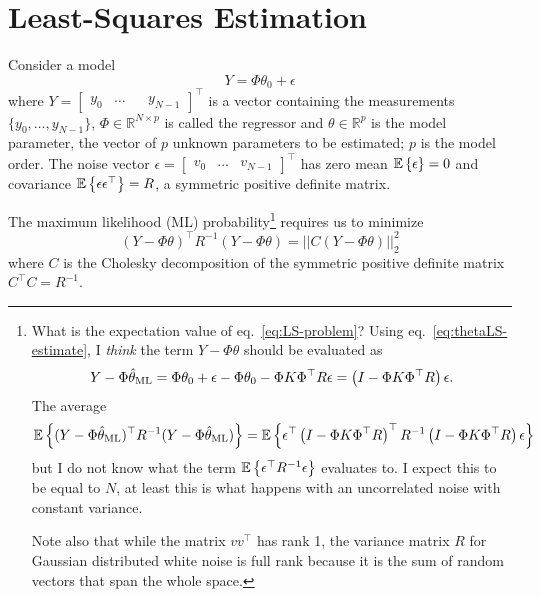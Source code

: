 \chapter{Least-Squares Estimation}
\label{chap:LS-estimation}

Consider a model
\begin{equation}
  \label{eq:LTI-with-noise}
  Y = \Phi\theta_0 + \epsilon
\end{equation}
where $Y = \begin{bmatrix}
  y_0 & \ldots && y_{N-1}
\end{bmatrix}^\top$ is a vector containing the measurements $\{y_0,\ldots, y_{N-1}\}$, $\Phi\in \mathbb{R}^{N\times p}$ is called the regressor and $\theta\in\mathbb{R}^p$ is the model parameter, the vector of $p$ unknown parameters to be estimated; $p$ is the model order.
The noise vector $\epsilon =
\begin{bmatrix}
  v_0 & \ldots & v_{N-1}
\end{bmatrix}^\top$ has zero mean $\mathbb{E}\left\{\epsilon\right\}=0$ and covariance $\mathbb{E}\left\{\epsilon \epsilon^\top\right\}=R$, a symmetric positive definite matrix.

The maximum likelihood (ML) probability\footnote{What is the expectation value of eq.~\eqref{eq:LS-problem}? Using eq.~\eqref{eq:thetaLS-estimate}, I \emph{think} the term $Y-\Phi\theta$ should be evaluated as
  \begin{equation*}
    Y-\Phi\hat{\theta}_\textrm{ML} = \Phi\theta_0 + \epsilon - \Phi\theta_0 - \Phi K \Phi^\top R\epsilon = \left(I - \Phi K \Phi^\top R\right)\epsilon.
  \end{equation*}
  The average
  \begin{equation*}
    \mathbb{E}\left\{(Y - \Phi \hat{\theta}_\textrm{ML})^\top R^{-1} (Y - \Phi \hat{\theta}_\textrm{ML})\right\} = \mathbb{E}\left\{\epsilon^\top\left(I - \Phi K \Phi^\top R\right)^\top R^{-1}\left(I - \Phi K \Phi^\top R\right)\epsilon\right\}
  \end{equation*}
  but I do not know what the term $\mathbb{E}\left\{\epsilon^\top R^{-1}\epsilon\right\}$ evaluates to. I expect this to be equal to $N$, at least this is what happens with an uncorrelated noise with constant variance.

  Note also that while the matrix $vv^\top$ has rank 1, the variance matrix $R$ for Gaussian distributed white noise is full rank because it is the sum of random vectors that span the whole space.} requires us to minimize
\begin{equation}
  \label{eq:LS-problem}
  (Y - \Phi \theta)^\top R^{-1} (Y - \Phi \theta) = ||C (Y - \Phi \theta)||_2^2
\end{equation}
where $C$ is the Cholesky decomposition of the symmetric positive definite matrix $C^\top C = R^{-1}$.

